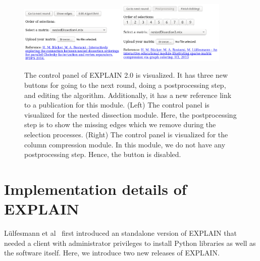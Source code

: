 \documentclass[12pt, twoside,a4paper,toc=bibliography]{scrbook}
\begin{document}
\begin{figure}
\centering
\includegraphics[width=0.45\textwidth]{bottom_new_explain1}
\hfill
\includegraphics[width=0.45\textwidth]{bottom_new_explain}
\caption{The control panel of EXPLAIN 2.0 is visualized.
It has three new buttons for going to the next round,
doing a postprocessing step, and editing the algorithm.
Additionally, it has a new reference link to a publication
for this module.
(Left) The control panel is visualized for the nested dissection module.
Here, the postprocessing step is to show the missing edges which we remove
during the selection processes.
(Right) The control panel is visualized for the column compression module.
In this module, we do not have any postprocessing step. Hence, the button is disabled.}
\label{f.bottom_new_explain}
\end{figure}
\section{Implementation details of EXPLAIN}
\label{s.impl.explain}
Lülfesmann et al~\cite{Lulfesmann2010} first introduced an standalone version of EXPLAIN that
needed a client with administrator privileges to install Python libraries as well as the software itself.
Here, we introduce two new releases of EXPLAIN.
\end{document}
